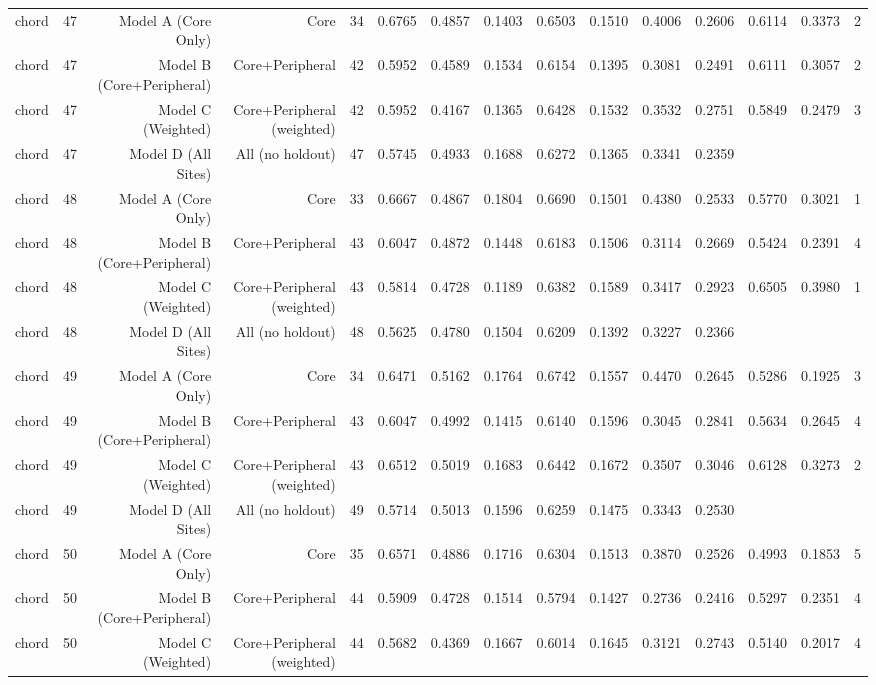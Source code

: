 {\begin{longtable}{lrrrrrrrrrrrrrr}
  chord & 47 & Model A (Core Only) & Core & 34 & 0.6765 & 0.4857 & 0.1403 & 0.6503 & 0.1510 & 0.4006 & 0.2606 & 0.6114 & 0.3373 & 2 \\
  chord & 47 & Model B (Core+Peripheral) & Core+Peripheral & 42 & 0.5952 & 0.4589 & 0.1534 & 0.6154 & 0.1395 & 0.3081 & 0.2491 & 0.6111 & 0.3057 & 2 \\
  chord & 47 & Model C (Weighted) & Core+Peripheral (weighted) & 42 & 0.5952 & 0.4167 & 0.1365 & 0.6428 & 0.1532 & 0.3532 & 0.2751 & 0.5849 & 0.2479 & 3 \\
  chord & 47 & Model D (All Sites) & All (no holdout) & 47 & 0.5745 & 0.4933 & 0.1688 & 0.6272 & 0.1365 & 0.3341 & 0.2359 &  &  &  \\
  chord & 48 & Model A (Core Only) & Core & 33 & 0.6667 & 0.4867 & 0.1804 & 0.6690 & 0.1501 & 0.4380 & 0.2533 & 0.5770 & 0.3021 & 1 \\
  chord & 48 & Model B (Core+Peripheral) & Core+Peripheral & 43 & 0.6047 & 0.4872 & 0.1448 & 0.6183 & 0.1506 & 0.3114 & 0.2669 & 0.5424 & 0.2391 & 4 \\
  chord & 48 & Model C (Weighted) & Core+Peripheral (weighted) & 43 & 0.5814 & 0.4728 & 0.1189 & 0.6382 & 0.1589 & 0.3417 & 0.2923 & 0.6505 & 0.3980 & 1 \\
  chord & 48 & Model D (All Sites) & All (no holdout) & 48 & 0.5625 & 0.4780 & 0.1504 & 0.6209 & 0.1392 & 0.3227 & 0.2366 &  &  &  \\
  chord & 49 & Model A (Core Only) & Core & 34 & 0.6471 & 0.5162 & 0.1764 & 0.6742 & 0.1557 & 0.4470 & 0.2645 & 0.5286 & 0.1925 & 3 \\
  chord & 49 & Model B (Core+Peripheral) & Core+Peripheral & 43 & 0.6047 & 0.4992 & 0.1415 & 0.6140 & 0.1596 & 0.3045 & 0.2841 & 0.5634 & 0.2645 & 4 \\
  chord & 49 & Model C (Weighted) & Core+Peripheral (weighted) & 43 & 0.6512 & 0.5019 & 0.1683 & 0.6442 & 0.1672 & 0.3507 & 0.3046 & 0.6128 & 0.3273 & 2 \\
  chord & 49 & Model D (All Sites) & All (no holdout) & 49 & 0.5714 & 0.5013 & 0.1596 & 0.6259 & 0.1475 & 0.3343 & 0.2530 &  &  &  \\
  chord & 50 & Model A (Core Only) & Core & 35 & 0.6571 & 0.4886 & 0.1716 & 0.6304 & 0.1513 & 0.3870 & 0.2526 & 0.4993 & 0.1853 & 5 \\
  chord & 50 & Model B (Core+Peripheral) & Core+Peripheral & 44 & 0.5909 & 0.4728 & 0.1514 & 0.5794 & 0.1427 & 0.2736 & 0.2416 & 0.5297 & 0.2351 & 4 \\
  chord & 50 & Model C (Weighted) & Core+Peripheral (weighted) & 44 & 0.5682 & 0.4369 & 0.1667 & 0.6014 & 0.1645 & 0.3121 & 0.2743 & 0.5140 & 0.2017 & 4 \\

\end{longtable}}
